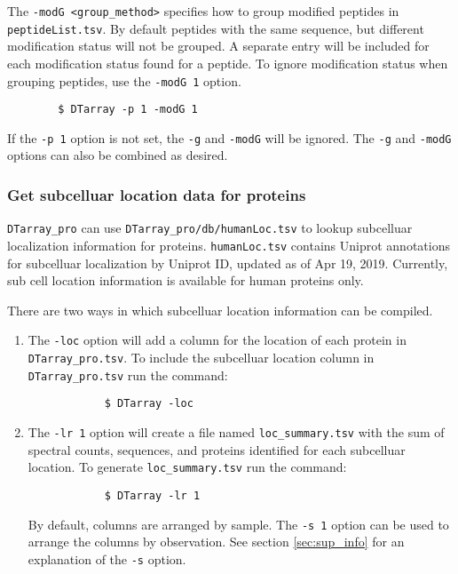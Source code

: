 \documentclass[12pt]{article}
\begin{document}
	\noindent
	The \texttt{-modG <group\_method>} specifies how to group modified peptides in \texttt{peptideList.tsv}.  By default peptides  with  the  same sequence, but different modification status will not be grouped. A separate entry will be  included for each modification status found for a peptide. To ignore modification status when grouping peptides, use the \texttt{-modG 1} option.
	
	\begin{lstlisting}
		$ DTarray -p 1 -modG 1
	\end{lstlisting}
	
	\noindent
	If the \texttt{-p 1} option is not set, the \texttt{-g} and \texttt{-modG} will be ignored. The \texttt{-g} and \texttt{-modG} options can also be combined as desired.  
	
	\subsubsection{Get subcelluar location data for proteins} \label{sec:loc}
	
	\texttt{DTarray\_pro} can use \texttt{DTarray\_pro/db/humanLoc.tsv}  to lookup subcelluar localization information for proteins.  \texttt{humanLoc.tsv} contains Uniprot annotations for subcelluar localization by Uniprot ID,	updated as of Apr 19, 2019. Currently, sub cell location information is available for human proteins only.
	
	\bigskip
	\noindent
	There are two ways in which subcelluar location information can be compiled.
	
	\begin{enumerate}
		\item The \texttt{-loc} option will add a column for the location of each protein in \texttt{DTarray\_pro.tsv}.  To include the subcelluar location column in \texttt{DTarray\_pro.tsv} run the command:
		
		\begin{lstlisting}
			$ DTarray -loc
		\end{lstlisting}

		\item The \texttt{-lr 1} option will create a file named \texttt{loc\_summary.tsv} with the sum of spectral counts, sequences, and proteins identified for each subcelluar location.  To generate \texttt{loc\_summary.tsv} run the command:
		
		\begin{lstlisting}
			$ DTarray -lr 1
		\end{lstlisting}
		
		\noindent
		By default, columns are arranged by sample.  The \texttt{-s 1} option can be used to arrange the columns by observation.  See section \ref{sec:sup_info} for an explanation of the \texttt{-s} option.  
	
	\end{enumerate}
	
\end{document}

